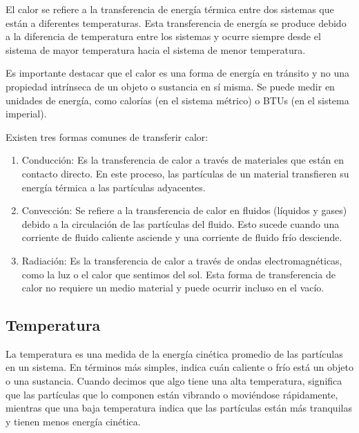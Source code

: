 \documentclass[letterpaper, 12pt]{article}
\begin{document}
El calor se refiere a la transferencia de energía térmica
entre dos sistemas que están a diferentes temperaturas.
Esta transferencia de energía se produce debido a la
diferencia de temperatura entre los sistemas y ocurre
siempre desde el sistema de mayor temperatura hacia el
sistema de menor temperatura.

Es importante destacar que el calor es una forma de energía
en tránsito y no una propiedad intrínseca de un objeto o
sustancia en sí misma. Se puede medir en unidades de
energía, como calorías (en el sistema métrico) o BTUs (en
el sistema imperial).

Existen tres formas comunes de transferir calor:

\begin{enumerate}
      \item Conducción: Es la transferencia de calor a través de
            materiales que están en contacto directo. En este proceso,
            las partículas de un material transfieren su energía
            térmica a las partículas adyacentes.

      \item Convección: Se refiere a la transferencia de calor en
            fluidos (líquidos y gases) debido a la circulación de las
            partículas del fluido. Esto sucede cuando una corriente de
            fluido caliente asciende y una corriente de fluido frío
            desciende.

      \item Radiación: Es la transferencia de calor a través de ondas
            electromagnéticas, como la luz o el calor que sentimos del
            sol. Esta forma de transferencia de calor no requiere un
            medio material y puede ocurrir incluso en el vacío.
\end{enumerate}

\subsection{Temperatura~\cite{temperatura}}

La temperatura es una medida de la energía cinética
promedio de las partículas en un sistema. En términos más
simples, indica cuán caliente o frío está un objeto o una
sustancia. Cuando decimos que algo tiene una alta
temperatura, significa que las partículas que lo componen
están vibrando o moviéndose rápidamente, mientras que una
baja temperatura indica que las partículas están más
tranquilas y tienen menos energía cinética.
\end{document}
